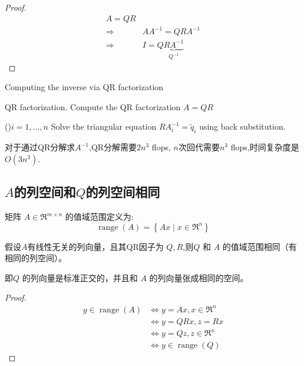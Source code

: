 \begin{proof}
    \begin{equation}\begin{aligned}
        A = QR\\
        \Rightarrow & A A^{-1} = QRA^{-1}\\
        \Rightarrow & I = Q\underbrace{RA^{-1} }_{Q^{-1}}
    \end{aligned}\end{equation}
\end{proof}

\begin{algorithm}[htbp]
    \caption{Computing the inverse via QR factorization}

    QR factorization. Compute the QR factorization $ A=Q R $\;

    \For(){$ i=1, \ldots, n $}{
        Solve the triangular equation $ R A^{-1}_{i}=\tilde{q}_{i} $ using back substitution.
    }
    
\end{algorithm}

对于通过QR分解求$A^{-1}$,QR分解需要$2n^3$ flops, $n$次回代需要$n^3$ flops,时间复杂度是$O(3n^3)$.

\subsection{$A$的列空间和$Q$的列空间相同}

矩阵 $A \in \mathfrak{R}^{m \times n}$ 的值域范围定义为:
\begin{equation}
\operatorname{range}(A)=\left\{A x \mid x \in \mathfrak{R}^{n}\right\}
\end{equation}

\begin{theorem}
    假设$A$有线性无关的列向量，且其QR因子为 $Q, R$,则$Q$ 和 $A$ 的值域范围相同（有相同的列空间）。

\end{theorem}

即$Q$ 的列向量是标准正交的，并且和 $A$ 的列向量张成相同的空间。

\begin{proof}
    \begin{equation}
\begin{aligned}
y \in \operatorname{range}(A) & \Leftrightarrow  y=A x, x \in \mathfrak{R}^{n} \\
& \Leftrightarrow  y=Q R x, z=R x \\
& \Leftrightarrow  y=Q z, z \in \mathfrak{R}^{n} \\
& \Leftrightarrow  y \in \operatorname{range}(Q)
\end{aligned}
\end{equation}
\end{proof}

